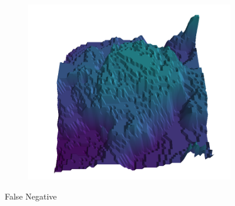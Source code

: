\documentclass[../document.tex]{subfiles}
\begin{document}
\begin{figure}[H]
    \begin{subfigure}[b]{0.19\textwidth}
        \includegraphics[width=\linewidth]{../img/5/quarry/false_negative//patch-3d-majavi-colormap-4.png}
    \end{subfigure}  

\caption{False Negative}    
\end{figure}
\end{document}
